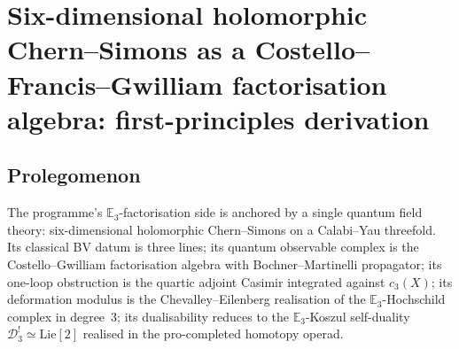 
\providecommand{\ClaimStatusTheorem}{\textsc{[theorem]}}
\providecommand{\ClaimStatusProposition}{\textsc{[proposition]}}
\providecommand{\ClaimStatusLemma}{\textsc{[lemma]}}
\providecommand{\ClaimStatusCorollary}{\textsc{[corollary]}}
\providecommand{\ClaimStatusDefinition}{\textsc{[definition]}}
\providecommand{\ClaimStatusDerivation}{\textsc{[first-principles]}}
\providecommand{\ClaimStatusRemark}{\textsc{[remark]}}
\providecommand{\ClaimStatusConjectured}{\textsc{[conjectured]}}

\providecommand{\CC}{\mathbb{C}}
\providecommand{\RR}{\mathbb{R}}
\providecommand{\ZZ}{\mathbb{Z}}
\providecommand{\QQ}{\mathbb{Q}}
\providecommand{\fg}{\mathfrak{g}}
\providecommand{\cA}{\mathcal{A}}
\providecommand{\cB}{\mathcal{B}}
\providecommand{\cE}{\mathcal{E}}
\providecommand{\cF}{\mathcal{F}}
\providecommand{\cO}{\mathcal{O}}
\providecommand{\cH}{\mathcal{H}}
\providecommand{\cK}{\mathcal{K}}
\providecommand{\cM}{\mathcal{M}}
\providecommand{\cD}{\mathcal{D}}
\providecommand{\cC}{\mathcal{C}}
\providecommand{\hCS}{\mathrm{hCS}}
\providecommand{\Conf}{\mathrm{Conf}}
\providecommand{\Obs}{\mathrm{Obs}}
\providecommand{\CE}{\mathrm{CE}}
\providecommand{\HH}{\mathrm{HH}}
\providecommand{\Sym}{\mathrm{Sym}}
\providecommand{\Kos}{\mathsf{K}}
\providecommand{\chir}{\mathrm{chir}}
\providecommand{\Dolb}{\mathrm{Dolb}}
\providecommand{\Tot}{\mathrm{Tot}}
\providecommand{\hbarb}{\hbar}
\providecommand{\BV}{\mathrm{BV}}
\providecommand{\BRST}{\mathrm{BRST}}

\section{Six-dimensional holomorphic Chern--Simons as a Costello--Francis--Gwilliam factorisation algebra: first-principles derivation}
\label{opus13:sec:main}

\subsection*{Prolegomenon}

The programme's $\mathbb E_3$-factorisation side is anchored by a single
quantum field theory: six-dimensional holomorphic Chern--Simons on a
Calabi--Yau threefold. Its classical BV datum is three lines; its
quantum observable complex is the Costello--Gwilliam factorisation
algebra with Bochner--Martinelli propagator; its one-loop obstruction
is the quartic adjoint Casimir integrated against $c_3(X)$; its
deformation modulus is the Chevalley--Eilenberg realisation of the
$\mathbb E_3$-Hochschild complex in degree~$3$; its dualisability
reduces to the $\mathbb E_3$-Koszul self-duality $\cD_3^! \simeq
\mathrm{Lie}[2]$ realised in the pro-completed homotopy operad.

